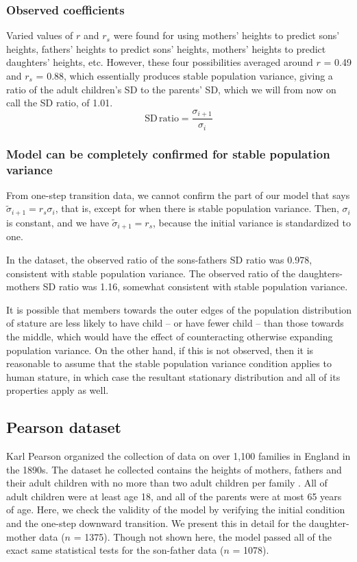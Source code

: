 \documentclass[a4paper,11pt]{article} %
\begin{document}
\subsubsection*{Observed coefficients}
Varied values of $r$ and $r_s$ were found for using mothers' heights to predict sons' heights, fathers' heights to predict sons' heights, mothers' heights to predict daughters' heights, etc. However, these four possibilities averaged around $r$ = 0.49 and $r_s$ = 0.88, which essentially produces stable population variance, giving a ratio of the adult children's SD to the parents' SD, which we will from now on call the SD ratio, of 1.01.
$$\mathrm{SD} \, \mathrm{ratio} = \frac{\sigma_{i+1}}{\sigma_i}$$

\subsubsection*{Model can be completely confirmed for stable population variance}
From one-step transition data, we cannot confirm the part of our model that says $\tilde{\sigma}_{i+1} = r_s \sigma_i$, that is, except for when there is stable population variance. Then, $\sigma_i$ is constant, and we have $\tilde{\sigma}_{i+1} = r_s$, because the initial variance is standardized to one.

In the dataset, the observed ratio of the sons-fathers SD ratio was 0.978, consistent with stable population variance. The observed ratio of the daughters-mothers SD ratio was 1.16, somewhat consistent with stable population variance. 

It is possible that members towards the outer edges of the population distribution of stature are less likely to have child -- or have fewer child -- than those towards the middle, which would have the effect of counteracting otherwise expanding population variance. On the other hand, if this is not observed, then it is reasonable to assume that the stable population variance condition applies to human stature, in which case the resultant stationary distribution and all of its properties apply as well. 



\subsection{Pearson dataset}

Karl Pearson organized the collection of data on over 1,100 families in England in the 1890s. The dataset he collected contains the heights of mothers, fathers and their adult children with no more than two adult children per family \cite{pearson}. All of adult children were at least age 18, and all of the parents were at most 65 years of age. Here, we check the validity of the model by verifying the initial condition and the one-step downward transition. We present this in detail for the daughter-mother data ($n$ = 1375). Though not shown here, the model passed all of the exact same statistical tests for the son-father data ($n$ = 1078).
\end{document}
